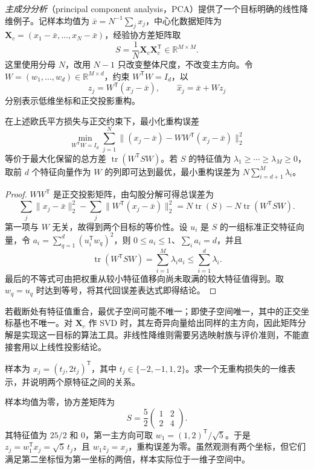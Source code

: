 \emph{主成分分析}（principal component analysis，PCA）提供了一个目标明确的线性降维例子。记样本均值为 $\bar x=N^{-1}\sum_jx_j$，中心化数据矩阵为 $\mathbf X_c=(x_1-\bar x,\ldots,x_N-\bar x)$，经验协方差矩阵取
\[
S=\frac1N\mathbf X_c\mathbf X_c^{\mathsf T}\in\mathbb R^{M\times M}.
\]
这里使用分母 $N$，改用 $N-1$ 只改变整体尺度，不改变主方向。令 $W=(w_1,\ldots,w_d)\in\mathbb R^{M\times d}$，约束 $W^{\mathsf T}W=I_d$，以
\begin{equation}
z_j=W^{\mathsf T}(x_j-\bar x),\qquad
\widehat x_j=\bar x+Wz_j
\label{eq:lh-unsup-pca-encoding}
\end{equation}
分别表示低维坐标和正交投影重构。

\begin{proposition}
\label{prop:lh-unsup-pca-objective}
在上述欧氏平方损失与正交约束下，最小化重构误差
\begin{equation}
\min_{W^{\mathsf T}W=I_d}
\sum_{j=1}^N\|(x_j-\bar x)-WW^{\mathsf T}(x_j-\bar x)\|_2^2
\label{eq:lh-unsup-pca-reconstruction}
\end{equation}
等价于最大化保留的总方差 $\operatorname{tr}(W^{\mathsf T}SW)$。若 $S$ 的特征值为 $\lambda_1\geq\cdots\geq\lambda_M\geq0$，取前 $d$ 个特征向量作为 $W$ 的列即可达到最优，最小重构误差为 $N\sum_{i=d+1}^M\lambda_i$。
\end{proposition}
\begin{proof}
$WW^{\mathsf T}$ 是正交投影矩阵，由勾股分解可得总误差为
\[
\sum_j\|x_j-\bar x\|_2^2
-\sum_j\|W^{\mathsf T}(x_j-\bar x)\|_2^2
=N\operatorname{tr}(S)-N\operatorname{tr}(W^{\mathsf T}SW).
\]
第一项与 $W$ 无关，故得到两个目标的等价性。设 $u_i$ 是 $S$ 的一组标准正交特征向量，令 $a_i=\sum_{q=1}^d(u_i^{\mathsf T}w_q)^2$，则 $0\leq a_i\leq1$、$\sum_i a_i=d$，并且
\[
\operatorname{tr}(W^{\mathsf T}SW)=\sum_{i=1}^M\lambda_i a_i
\leq\sum_{i=1}^d\lambda_i.
\]
最后的不等式可由把权重从较小特征值移向尚未取满的较大特征值得到。取 $w_q=u_q$ 时达到等号，将其代回误差表达式即得结论。
\end{proof}

若截断处有特征值重合，最优子空间可能不唯一；即使子空间唯一，其中的正交坐标基也不唯一。对 $\mathbf X_c$ 作 SVD 时，其左奇异向量给出同样的主方向，因此矩阵分解是实现这一目标的算法工具。非线性降维则需要另选映射族与评价准则，不能直接套用以上线性投影结论。

\begin{example}
\label{ex:lh-unsup-pca}
样本为 $x_j=(t_j,2t_j)^{\mathsf T}$，其中 $t_j\in\{-2,-1,1,2\}$。求一个无重构损失的一维表示，并说明两个原特征之间的关系。
\end{example}
\begin{solve}
样本均值为零，协方差矩阵为
\[
S=\frac52\begin{pmatrix}1&2\\2&4\end{pmatrix}.
\]
其特征值为 $25/2$ 和 $0$，第一主方向可取 $w_1=(1,2)^{\mathsf T}/\sqrt5$。于是 $z_j=w_1^{\mathsf T}x_j=\sqrt5\,t_j$，且 $w_1z_j=x_j$，重构误差为零。虽然观测有两个坐标，但它们满足第二坐标恒为第一坐标的两倍，样本实际位于一维子空间中。
\end{solve}

